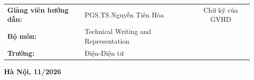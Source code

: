 \begin{titlepage}
\begin{center}
\begin{table}[H]
    \centering
    \begin{tabular}{l l c}
\textbf{\fontsize{13pt}{0pt}\selectfont Giảng viên hướng dẫn:} & {\fontsize{13pt}{0pt}\selectfont PGS.TS.Nguyễn Tiến Hòa} & {\fontsize{10pt}{0pt}\selectfont Chữ ký của GVHD}\\
\textbf{\fontsize{13pt}{0pt}\selectfont Bộ môn:} & {\fontsize{13pt}{0pt}\selectfont Technical Writing and Representation}\\
\textbf{\fontsize{13pt}{0pt}\selectfont Trường:} & {\fontsize{13pt}{0pt}\selectfont Điện-Điện tử}
\end{tabular}
\end{table}
\vspace{3.5cm}
 \textbf{\fontsize{13pt}{0pt}\selectfont Hà Nội, 11/2026}
\end{center}
\end{titlepage}

\cleardoublepage
